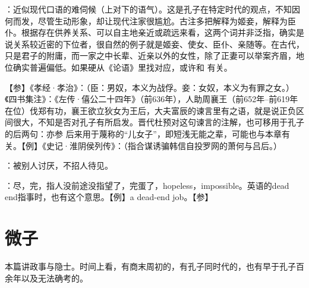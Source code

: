 {
\item {}：近似现代口语的难伺候（上对下的语气）。这是孔子在特定时代的观点，不知因何而发，尽管生动形象，却让现代注家很尴尬。古注多把解释为姬妾，解释为臣仆。根据存在供养关系、可以自主地亲近或疏远来看，这两个词并非泛指，确实是说关系较近密的下位者，很自然的例子就是姬妾、使女、臣仆、亲随等。在古代，只是君子的附庸，而一家之中长辈、近亲以外的女性，除了正妻可以举案齐眉，地位确实普遍偏低。如果硬从《论语》里找对应，或许和  有关。

【参】《孝经·孝治》：（臣：男奴，本义为战俘。妾：女奴，本义为有罪之女。）《四书集注》：《左传·僖公二十四年》（前636年），人助周襄王（前652年--前619年在位）伐郑有功，襄王欲立狄女为王后，大夫富辰的谏言里有之语，就是说正负区间很大，不知是否对孔子有所启发。晋代杜预对这句谏言的注解，也可移用于孔子的后两句：亦参  后来用于蔑称的“儿女子”，即短浅无能之辈，可能也与本章有关。【例】《史记·淮阴侯列传》：（指合谋诱骗韩信自投罗网的萧何与吕后。）
}
{}


{
\item {}：被别人讨厌，不招人待见。

\item {}：尽，完，指人没前途没指望了，完蛋了，hopeless，impossible。英语的dead end指事时，也有这个意思。【例】a dead-end job。【参】
}
{}



\chapter{微子}

本篇讲政事与隐士。时间上看，有商末周初的，有孔子同时代的，也有早于孔子百余年以及无法确考的。

